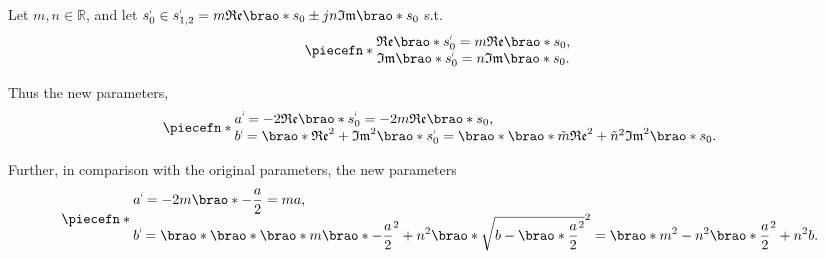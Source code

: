 \documentclass[12pt]{article}
\DeclarePairedDelimiter\brao()%
\DeclarePairedDelimiter\piecefn\{.
\newcommand{\setprime}[2][1]{%
    {#2}^{%
        \raisebox{1pt}{%
            \scalebox{0.5}{%
                \itshape\sffamily\uppercase%
                \expandafter{%
                    \romannumeral#1%
                }%
            }%
        }
    }%
}%
\begin{document}
\begin{enumerate}[(a)]
        Let $m,n \in \mathbb{R}$, and let $\setprime{s}_0 \in \setprime{s}_{1,2} = m\mathfrak{Re}\brao*{s_0} \pm jn\mathfrak{Im}\brao*{s_0}$ s.t.
        \begin{equation}
            \piecefn*{
                \begin{matrix}
                    \mathfrak{Re}\brao*{\setprime{s}_0} = m\mathfrak{Re}\brao*{s_0},
                \\*
                    \mathfrak{Im}\brao*{\setprime{s}_0} = n\mathfrak{Im}\brao*{s_0}.
                \\*
                \end{matrix}
            }
        \end{equation}

        Thus the new parameters,
        \begin{equation}
            \piecefn*{
                \begin{array}{@{}l@{}}\displaystyle
                      \setprime{a}
                    = -2\mathfrak{Re}\brao*{\setprime{s}_0}
                    = -2m\mathfrak{Re}\brao*{s_0}
                    \rlap,
                \\*
                      \setprime{b}
                    = \brao*{\mathfrak{Re}^2 + \mathfrak{Im}^2}\brao*{\setprime{s}_0}
                    = \brao*{\brao*{\tilde{m}\mathfrak{Re}}^2 + \tilde{n}^2\mathfrak{Im}^2}\brao*{s_0}
                    \rlap.
                \\*
                \end{array}
            }
        \end{equation}

        Further, in comparison with the original parameters,
        the new parameters
        \begin{equation}
            \piecefn*{
                \begin{array}{@{}l@{}}\displaystyle
                      \setprime{a}
                    = -2m\brao*{-\frac{a}2}
                    = ma
                    \rlap,
                \\*\displaystyle
                      \setprime{b}
                    = \brao*{\brao*{\brao*m\brao*{-\frac{a}2}}^2 + n^2\brao*{\sqrt{b - \brao*{\frac{a}2}^2}}^2}
                    = \brao*{m^2 - n^2}\brao*{\frac{a}2}^2 + n^2 b
                    \rlap.
                \\*
                \end{array}
            }
        \end{equation}


\end{enumerate}
\end{document}
